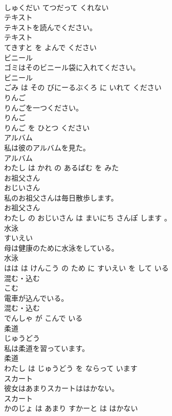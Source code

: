 \documentclass[8pt]{extreport}
\begin{document}
\begin{CJK}{UTF8}{min}
\\	しゅくだい てつだって くれない			
\\	テキスト	
\\	テキストを読んでください。	
\\	テキスト 
\\	てきすと を よんで ください			
\\	ビニール	
\\	ゴミはそのビニール袋に入れてください。	
\\	ビニール 
\\	ごみ は その びにーるぶくろ に いれて ください			
\\	りんご	
\\	りんごを一つください。	
\\	りんご 
\\	りんご を ひとつ ください			
\\	アルバム	
\\	私は彼のアルバムを見た。	
\\	アルバム 
\\	わたし は かれ の あるばむ を みた			
\\	お祖父さん	
\\	おじいさん			
\\	私のお祖父さんは毎日散歩します。	
\\	お祖父さん 
\\	わたし の おじいさん は まいにち さんぽ します 。			
\\	水泳	
\\	すいえい			
\\	母は健康のために水泳をしている。	
\\	水泳 
\\	はは は けんこう の ため に すいえい を して いる			
\\	混む・込む	
\\	こむ			
\\	電車が込んでいる。	
\\	混む・込む 
\\	でんしゃ が こんで いる			
\\	柔道	
\\	じゅうどう			
\\	私は柔道を習っています。	
\\	柔道 
\\	わたし は じゅうどう を ならって います			
\\	スカート	
\\	彼女はあまりスカートははかない。	
\\	スカート 
\\	かのじょ は あまり すかーと は はかない			

\end{CJK}
\end{document}
